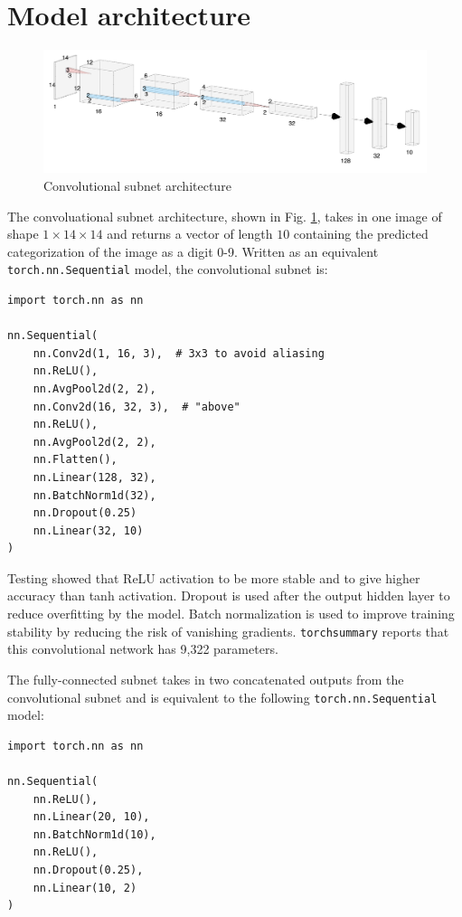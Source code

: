 \documentclass[prl, article, twocolumn]{revtex4-1}
\begin{document}
\section{Model architecture}
\begin{figure}[h!]
    \centering
    \includegraphics[width=\linewidth]{figures/LeNet.png}
    \caption{Convolutional subnet architecture}
    \label{fig:lenet}
\end{figure}

The convoluational subnet architecture, shown in Fig. \ref{fig:lenet}, takes in one image of shape $1 \times 14 \times 14$ and returns a vector of length $10$ containing the predicted categorization of the image as a digit 0-9. Written as an equivalent \texttt{torch.nn.Sequential} model, the convolutional subnet is:

\begin{verbatim}
import torch.nn as nn

nn.Sequential(
    nn.Conv2d(1, 16, 3),  # 3x3 to avoid aliasing
    nn.ReLU(),
    nn.AvgPool2d(2, 2),
    nn.Conv2d(16, 32, 3),  # "above"
    nn.ReLU(),
    nn.AvgPool2d(2, 2),
    nn.Flatten(),
    nn.Linear(128, 32),
    nn.BatchNorm1d(32),
    nn.Dropout(0.25)
    nn.Linear(32, 10)
)
\end{verbatim}

Testing showed that ReLU activation to be more stable and to give higher accuracy than tanh activation. Dropout is used after the output hidden layer to reduce overfitting by the model. Batch normalization is used to improve training stability by reducing the risk of vanishing gradients. \texttt{torchsummary} reports that this convolutional network has 9,322 parameters.

The fully-connected subnet takes in two concatenated outputs from the convolutional subnet and is equivalent to the following \texttt{torch.nn.Sequential} model:

\begin{verbatim}
import torch.nn as nn

nn.Sequential(
    nn.ReLU(),
    nn.Linear(20, 10),
    nn.BatchNorm1d(10),
    nn.ReLU(),
    nn.Dropout(0.25),
    nn.Linear(10, 2)
)
\end{verbatim}
\end{document}

